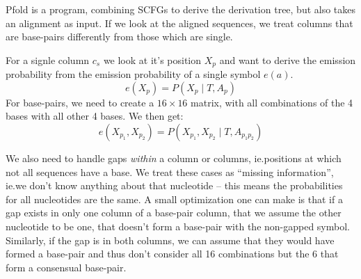 Pfold is a program, combining SCFGs to derive the derivation tree, but also
takes an alignment as input.  If we look at the aligned sequences, we treat
columns that are base-pairs differently from those which are single.

For a signle column \(c_s\) we look at it's position \(X_p\) and want to derive
the emission probability from the emission probability of a single symbol
\(e(a)\).
\[
  e(X_p) = P(X_p \mid T, A_p)
\]
For base-pairs, we need to create a \(16\times 16\) matrix, with
all combinations of the 4 bases with all other 4 bases.  We then get:
\[
  e(X_{p_1}, X_{p_2}) = P(X_{p_1}, X_{p_2} \mid T, A_{p_1 p_2})
\]

We also need to handle gaps \emph{within} a column or columns, ie.\@ positions
at which not all sequences have a base.  We treat these cases as
\enquote{missing information}, ie.\@ we don't know anything about that
nucleotide -- this means the probabilities for all nucleotides are the same.
A small optimization one can make is that if a gap exists in only one column
of a base-pair column, that we assume the other nucleotide to be one, that
doesn't form a base-pair with the non-gapped symbol.  Similarly, if the gap is
in both columns, we can assume that they would have formed a base-pair and thus
don't consider all 16 combinations but the 6 that form a consensual base-pair.

